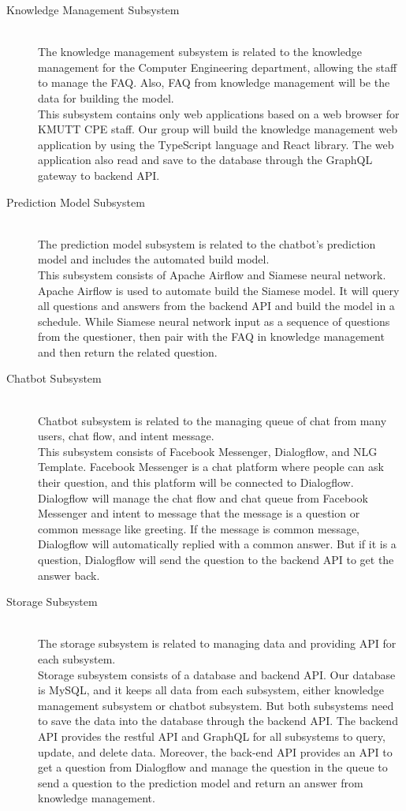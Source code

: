 \documentclass[12pt,oneside,openright,a4paper]{cpe-english-project}
\begin{document}
\begin{description}
	\item [Knowledge Management Subsystem]
	\hfill \\The knowledge management subsystem is related to the knowledge management for the Computer Engineering department, allowing the staff to manage the FAQ. Also, FAQ from knowledge management will be the data for building the model.\\
	This subsystem contains only web applications based on a web browser for KMUTT CPE staff. Our group will build the knowledge management web application by using the TypeScript language and React library. The web application also read and save to the database through the GraphQL gateway to backend API.
	\item [Prediction Model Subsystem]
	\hfill \\The prediction model subsystem is related to the chatbot's prediction model and includes the automated build model.\\
	This subsystem consists of Apache Airflow and Siamese neural network. Apache Airflow is used to automate build the Siamese model. It will query all questions and answers from the backend API and build the model in a schedule. While Siamese neural network input as a sequence of questions from the questioner, then pair with the FAQ in knowledge management and then return the related question.
	\item [Chatbot Subsystem]
	\hfill \\Chatbot subsystem is related to the managing queue of chat from many users, chat flow, and intent message.\\
	This subsystem consists of Facebook Messenger, Dialogflow, and NLG Template. Facebook Messenger is a chat platform where people can ask their question, and this platform will be connected to Dialogflow. Dialogflow will manage the chat flow and chat queue from Facebook Messenger and intent to message that the message is a question or common message like greeting. If the message is common message, Dialogflow will automatically replied with a common answer. But if it is a question, Dialogflow will send the question to the backend API to get the answer back.
	\item [Storage Subsystem]
	\hfill \\The storage subsystem is related to managing data and providing API for each subsystem.\\
	Storage subsystem consists of a database and backend API. Our database is MySQL, and it keeps all data from each subsystem, either knowledge management subsystem or chatbot subsystem. But both subsystems need to save the data into the database through the backend API. The backend API provides the restful API and GraphQL for all subsystems to query, update, and delete data. Moreover, the back-end API provides an API to get a question from Dialogflow and manage the question in the queue to send a question to the prediction model and return an answer from knowledge management.
\end{description}
\end{document}
